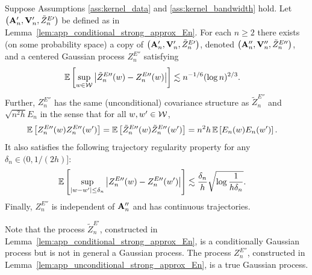 \begin{lemma}
  \label{lem:app_unconditional_strong_approx_En}

  Suppose Assumptions
  \ref{ass:kernel_data} and \ref{ass:kernel_bandwidth} hold.
  Let $\big(\mathbf{A}_n', \mathbf{V}_n', \tilde Z_n^{E\prime}\big)$
  be defined as in
  Lemma~\ref{lem:app_conditional_strong_approx_En}.
  For each $n \geq 2$
  there exists
  (on some probability space)
  a copy of
  $\big(\mathbf{A}_n', \mathbf{V}_n', \tilde Z_n^{E\prime}\big)$,
  denoted
  $\big(\mathbf{A}_n'', \mathbf{V}_n'', \tilde Z_n^{E\prime\prime}\big)$,
  and a centered
  Gaussian process
  $Z^{E\dprime}_n$
  satisfying
  \begin{align*}
    \mathbb{E}\left[
      \sup_{w \in \mathcal{W}}
      \big|\tilde Z_n^{E\prime\prime}(w) - Z_n^{E\prime\prime}(w)\big|
    \right]
    &\lesssim
    n^{-1/6} (\log n)^{2/3}.
  \end{align*}
  Further,
  $Z_n^{E\dprime}$ has the same
  (unconditional) covariance structure as
  $\tilde Z_n^{E\dprime}$
  and
  $\sqrt{n^2h} E_n$
  in the sense that for all $w, w' \in \mathcal{W}$,
  \begin{align*}
    \mathbb{E}\left[
      Z_n^{E\prime\prime}(w)
      Z_n^{E\prime\prime}(w')
    \right]
    &=
    \mathbb{E}\left[
      \tilde Z_n^{E\prime\prime}(w)
      \tilde Z_n^{E\prime\prime}(w')
    \right]
    =
    n^2h \,
    \mathbb{E}\left[
      E_n(w)
      E_n(w')
    \right].
  \end{align*}
  It also satisfies the following
  trajectory regularity property
  for any $\delta_n \in (0, 1/(2h)]$:
  \begin{align*}
    \mathbb{E}\left[
      \sup_{|w-w'| \leq \delta_n}
      \big|
      Z_n^{E\prime\prime}(w)
      - Z_n^{E\prime\prime}(w')
      \big|
    \right]
    &\lesssim
    \frac{\delta_n}{h}
    \sqrt{\log \frac{1}{h\delta_n}}.
  \end{align*}
  Finally, $Z_n^{E\dprime}$ is independent of $\mathbf{A}_n''$
  and has continuous trajectories.

\end{lemma}

\begin{remark}

  Note that the process $\tilde Z_n^{E\prime}$,
  constructed in Lemma~\ref{lem:app_conditional_strong_approx_En},
  is a conditionally Gaussian process but is
  not in general a Gaussian process.
  The process $Z_n^{E\dprime}$,
  constructed in Lemma~\ref{lem:app_unconditional_strong_approx_En},
  is a true Gaussian process.

\end{remark}

